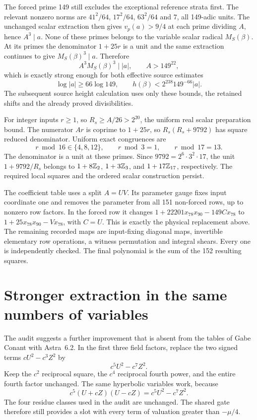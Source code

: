 \documentclass[11pt]{article}
\theoremstyle{remark}\newtheorem{remark}[theorem]{Remark}
\begin{document}
The forced prime 149 still excludes the exceptional reference strata
first. The relevant nonzero norms are $41^2/64$, $17^2/64$, $63^2/64$
and $7$, all 149-adic units. The unchanged scalar extraction then gives
$v_p(a)>9/4$ at each prime dividing $A$, hence $A^3\mid a$.
None of these primes belongs to the variable scalar radical $M_S(\beta)$.
At its primes the denominator $1+25r$ is a unit and the same extraction
continues to give $M_S(\beta)^3\mid a$. Therefore
\[
 A^3M_S(\beta)^3\mid |a|,
 \qquad A>149^{22},
\]
which is exactly strong enough for both effective source estimates
\[
 \log|a|\ge66\log149,\qquad
 h(\beta)<2^{238}149^{-66}|a|.
\]
The subsequent source height calculation uses only these bounds, the
retained shifts and the already proved divisibilities.

For integer inputs $r\ge1$, so $R_s\ge A/26>2^{20}$, the uniform
real scalar preparation bound. The numerator $Ar$ is coprime to
$1+25r$, so $R_s(R_s+9792)$ has square reduced denominator.
Uniform exact congruences are
\[
 r\bmod16\in\{4,8,12\},\qquad r\bmod3=1,
 \qquad r\bmod17=13.
\]
The denominator is a unit at these primes. Since
$9792=2^6\cdot3^2\cdot17$, the unit $1+9792/R_s$ belongs to
$1+8\mathbb Z_2$, $1+3\mathbb Z_3$, and $1+17\mathbb Z_{17}$, respectively.
The required local squares and the ordered scalar construction persist.

The coefficient table uses a split $A=UV$. Its parameter gauge fixes
input coordinate one and removes the parameter from all 151 non-forced
rows, up to nonzero row factors. In the forced row it changes
$1+22201x_{78}x_{90}-149C x_{78}$ to
$1+25x_{78}x_{90}-Vx_{78}$, with $C=U$.
This is exactly the physical replacement above. The remaining recorded
maps are input-fixing diagonal maps, invertible elementary row operations,
a witness permutation and integral shears. Every one is independently
checked. The final polynomial is the sum of the 152 resulting squares.

\section{Stronger extraction in the same numbers of variables}
The audit suggests a further improvement that is absent from the
tables of Gabe Conant with Astra~6.2. In the first three field factors, replace the two
signed terms $cU^2-c^3Z^2$ by
\[
                         c^5U^2-c^7Z^2.
\]
Keep the $c^2$ reciprocal square, the $c^4$ reciprocal fourth power,
and the entire fourth factor unchanged. The same hyperbolic variables
work, because
\[
              c^5(U+cZ)(U-cZ)=c^5U^2-c^7Z^2.
\]
The four residue classes used in the audit are unchanged. The shared
gate therefore still provides a slot with every term of valuation
greater than $-\mu/4$.
\end{document}

